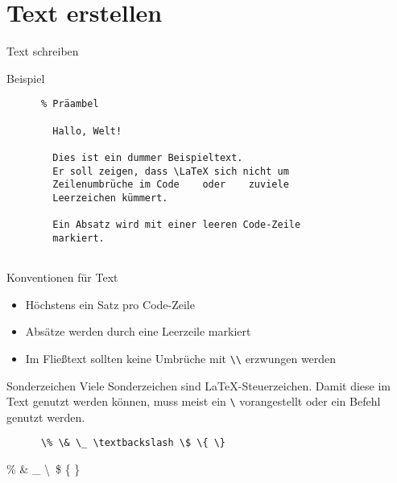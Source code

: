 \section{Text erstellen}

\begin{frame}[fragile]{Text schreiben}
  \begin{block}{Beispiel}
    \begin{lstlisting}
      % Präambel
      
        Hallo, Welt!

        Dies ist ein dummer Beispieltext.
        Er soll zeigen, dass \LaTeX sich nicht um
        Zeilenumbrüche im Code    oder    zuviele
        Leerzeichen kümmert.

        Ein Absatz wird mit einer leeren Code-Zeile
        markiert.
      
    \end{lstlisting}
  \end{block}
\end{frame}

\begin{frame}[fragile]{Konventionen für Text}
  \begin{itemize}
    \item Höchstens ein Satz pro Code-Zeile
    \item Absätze werden durch eine Leerzeile markiert
    \item Im Fließtext sollten keine Umbrüche mit \verb+\\+ erzwungen werden
  \end{itemize}
  \begin{alertblock}{Sonderzeichen}
    Viele Sonderzeichen sind \LaTeX-Steuerzeichen.
    Damit diese im Text genutzt werden können, muss meist ein \verb+\+ vorangestellt oder ein Befehl genutzt werden.
  \end{alertblock}
  \begin{CodeExample}{0.6}
    \begin{lstlisting}
      \% \& \_ \textbackslash \$ \{ \}
    \end{lstlisting}
  \CodeResult
    \% \& \_ \textbackslash\ \$ \{ \}
  \end{CodeExample}
\end{frame}

